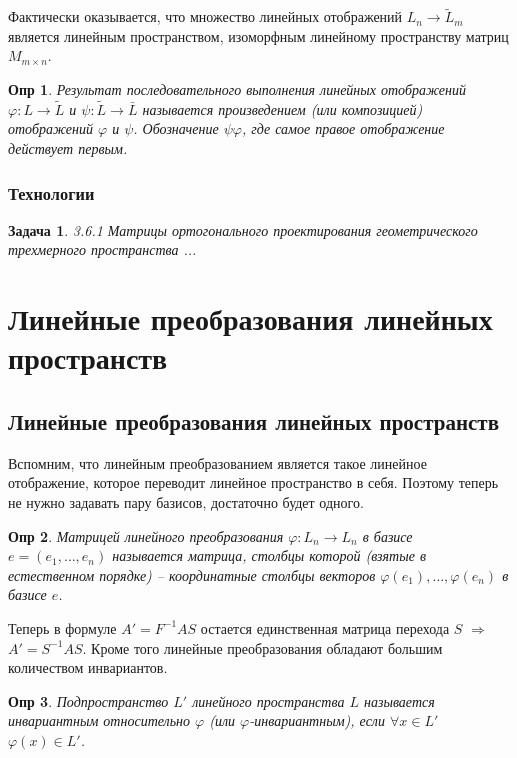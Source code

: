 \documentclass[a4paper,12pt]{article}
\newtheorem*{definition}{Опр}
\newtheorem*{prob}{Задача}
\begin{document}
Фактически оказывается, что множество линейных отображений $L_n \to \tilde{L}_m$ является линейным пространством, изоморфным линейному пространству матриц $M_{m \times n}$.

\begin{definition}
	Результат последовательного выполнения линейных отображений $\varphi: L \to \tilde{L}$ и $\psi: \tilde{L}\to \bar{L}$ называется произведением (или композицией) отображений $\varphi$ и $\psi$. Обозначение $\psi \varphi$, где самое правое отображение действует первым.
\end{definition}

\subsubsection{Технологии}

\begin{prob}
	3.6.1 Матрицы ортогонального проектирования геометрического трехмерного пространства ...
\end{prob}

\section{Линейные преобразования линейных пространств}
\subsection{Линейные преобразования линейных пространств}

Вспомним, что линейным преобразованием является такое линейное отображение, которое переводит линейное пространство в себя. Поэтому теперь не нужно задавать пару базисов, достаточно будет одного.

\begin{definition}
	Матрицей линейного преобразования $\varphi : L_n \to L_n$ в базисе $e = (e_1, \ldots, e_n)$ называется матрица, столбцы которой (взятые в естественном порядке) -- координатные столбцы векторов $\varphi(e_1), \ldots, \varphi(e_n)$ в базисе $e$.
\end{definition}
	
Теперь в формуле $A' = F^{-1} A S$ остается единственная матрица перехода $S$ $\Rightarrow$ $A' = S^{-1} A S$. Кроме того линейные преобразования обладают большим количеством инвариантов.

\begin{definition}
	Подпространство $L'$ линейного пространства $L$ называется инвариантным относительно $\varphi$ (или $\varphi$-инвариантным), если $\forall x \in L'$ $\varphi(x) \in L'$.
\end{definition}
\end{document}
